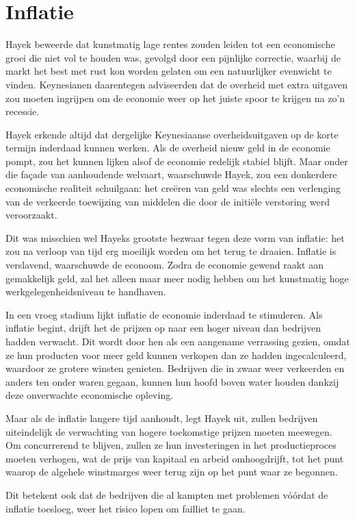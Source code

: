 \documentclass[
  a5paper,
  smalldemyvopaper,11pt,twoside,onecolumn,openright,extrafontsizes,
hidelinks]{memoir}
\begin{document}
\section{Inflatie}\label{inflatie}

Hayek beweerde dat kunstmatig lage rentes zouden leiden tot een
economische groei die niet vol te houden was, gevolgd door een pijnlijke
correctie, waarbij de markt het best met rust kon worden gelaten om een
natuurlijker evenwicht te vinden. Keynesianen daarentegen adviseerden
dat de overheid met extra uitgaven zou moeten ingrijpen om de economie
weer op het juiste spoor te krijgen na zo'n recessie.

Hayek erkende altijd dat dergelijke Keynesiaanse overheidsuitgaven op de
korte termijn inderdaad kunnen werken. Als de overheid nieuw geld in de
economie pompt, zou het kunnen lijken alsof de economie redelijk stabiel
blijft. Maar onder die façade van aanhoudende welvaart, waarschuwde
Hayek, zou een donkerdere economische realiteit schuilgaan: het creëren
van geld was slechts een verlenging van de verkeerde toewijzing van
middelen die door de initiële verstoring werd veroorzaakt.

Dit was misschien wel Hayeks grootste bezwaar tegen deze vorm van
inflatie: het zou na verloop van tijd erg moeilijk worden om het terug
te draaien. Inflatie is verslavend, waarschuwde de econoom. Zodra de
economie gewend raakt aan gemakkelijk geld, zal het alleen maar meer
nodig hebben om het kunstmatig hoge werkgelegenheidsniveau te handhaven.

In een vroeg stadium lijkt inflatie de economie inderdaad te stimuleren.
Als inflatie begint, drijft het de prijzen op naar een hoger niveau dan
bedrijven hadden verwacht. Dit wordt door hen als een aangename
verrassing gezien, omdat ze hun producten voor meer geld kunnen verkopen
dan ze hadden ingecalculeerd, waardoor ze grotere winsten genieten.
Bedrijven die in zwaar weer verkeerden en anders ten onder waren gegaan,
kunnen hun hoofd boven water houden dankzij deze onverwachte economische
opleving.

Maar als de inflatie langere tijd aanhoudt, legt Hayek uit, zullen
bedrijven uiteindelijk de verwachting van hogere toekomstige prijzen
moeten meewegen. Om concurrerend te blijven, zullen ze hun investeringen
in het productieproces moeten verhogen, wat de prijs van kapitaal en
arbeid omhoogdrijft, tot het punt waarop de algehele winstmarges weer
terug zijn op het punt waar ze begonnen.

Dit betekent ook dat de bedrijven die al kampten met problemen vóórdat
de inflatie toesloeg, weer het risico lopen om failliet te gaan.
\end{document}
